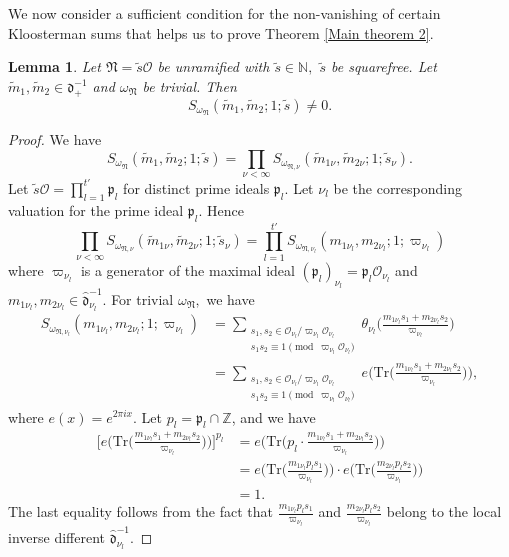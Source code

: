 \documentclass[reqno]{amsart}
\theoremstyle{plain}
\newtheorem{lemma}[theorem]{Lemma}
\theoremstyle{definition}
\theoremstyle{remark}
\begin{document}
We now consider a sufficient condition for the non-vanishing of certain Kloosterman sums that helps us to prove Theorem \ref{Main theorem 2}. 
 \begin{lemma}\label{Kloosterman sum nonzero}
 Let  $\mathfrak{N}=\tilde{s}\mathcal{O}$ be unramified with $\tilde{s}\in \mathbb{N},$  $\tilde{s}$ be squarefree. Let $\tilde{m}_1,\tilde{m}_2 \in \mathfrak{d}^{-1}_+$ and  $\omega_{\mathfrak{N}}$  be trivial. Then   $$S_{\omega_\mathfrak{N}} (\tilde{m}_1,\tilde{m}_2;1;\tilde{s})\neq 0.$$
 \end{lemma}
\begin{proof}
We have $$S_{\omega_\mathfrak{N}} (\tilde{m}_1,\tilde{m}_2;1;\tilde{s})=\prod _{\nu<\infty } S_{\omega_{\mathfrak{N},\nu}} (\tilde{m}_{1\nu},\tilde{m}_{2\nu};1;\tilde{s}_\nu).$$ Let $\tilde{s}\mathcal{O}=\prod_{l=1}^{t'}\mathfrak{p}_l$ for distinct prime ideals $\mathfrak{p}_l.$  Let $\nu_l$ be the corresponding valuation for the prime ideal $\mathfrak{p}_l.$ Hence 
$$
\prod _{\nu<\infty } S_{\omega_{\mathfrak{N},\nu}} (\tilde{m}_{1\nu},\tilde{m}_{2\nu};1;\tilde{s}_\nu)=\prod_{l=1}^{t'} S_{\omega_{\mathfrak{N},\nu_l}} (m_{1\nu_l},m_{2\nu_l};1;\varpi_{\nu_l})
$$
where $\varpi_{\nu_l}$ is a generator of the maximal ideal $(\mathfrak{p}_l)_{\nu_l}=\mathfrak{p}_l\mathcal{O}_{\nu_l}$ and   $m_{1\nu_l},m_{2\nu_l} \in  \hat{\mathfrak{d}}_{\nu_l}^{-1}.$ 
For trivial $\omega_\mathfrak{N},$ we have 
\begin{align*}
S_{\omega_{\mathfrak{N},\nu_l}} (m_{1\nu_l},m_{2\nu_l};1;\varpi_{\nu_l})&=\sum_{\substack{ s_{1},s_{2}\in \mathcal{O}_{\nu_l} / \varpi_{\nu_l} \mathcal{O}_{\nu_l}  \\{s_1s_2\equiv 1 \pmod {\varpi_{\nu_l}\mathcal{O}_{\nu_l}} }} }\theta_{\nu_l} \Big(\frac{m_{1\nu_l} s_{1}+m_{2\nu_l} s_{2}}{\varpi_{\nu_l}}\Big) \\
&=\sum_{\substack{ s_{1},s_{2}\in \mathcal{O}_{\nu_l} / \varpi_{\nu_l} \mathcal{O}_{\nu_l}  \\{s_1s_2\equiv 1 \pmod {\varpi_{\nu_l}\mathcal{O}_{\nu_l}} }} } e\Bigg(\text{Tr}\Big( \frac{m_{1\nu_l} s_{1}+m_{2\nu_l} s_{2}}{\varpi_{\nu_l}}  \Big)\Bigg),
\end{align*}
where $e(x)=e^{2\pi i x}.$
 Let $p_l=\mathfrak{p}_l \cap \mathbb{Z}$, and we have 
\begin{align*}
\Bigg[e\Bigg(\mathrm{Tr}\Big( \frac{m_{1\nu_l} s_{1}+m_{2\nu_l} s_{2}}{\varpi_{\nu_l}}  \Big)\Bigg)\Bigg]^{p_l} &= 
e\Bigg( \mathrm{Tr}\Big( p_l \cdot  \frac{m_{1\nu_l} s_{1}+m_{2\nu_l} s_{2}}{\varpi_{\nu_l}}  \Big)\Bigg) \\
&= e\Bigg( \mathrm{Tr}\Big(   \frac{m_{1  \nu_l}p_ls_{1}}{\varpi_{\nu_l}}  \Big)\Bigg)\cdot e\Bigg( \mathrm{Tr}\Big(   \frac{m_{2  \nu_l}p_ls_{2}}{\varpi_{\nu_l}}  \Big)\Bigg)\\
&= 1.
\end{align*}
The last equality follows from the fact that $ \frac{m_{1  \nu_l}p_ls_{1}}{\varpi_{\nu_l}} $ and $   \frac{m_{2  \nu_l}p_ls_{2}}{\varpi_{\nu_l}}$ belong to the local inverse different $ \hat{\mathfrak{d}}_{\nu_l}^{-1}$.


\end{proof}
\end{document}

